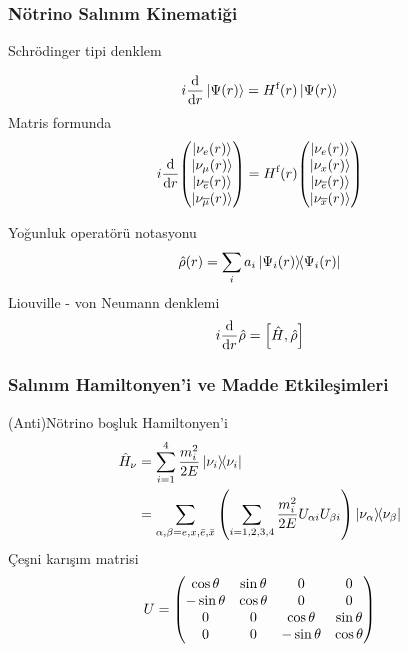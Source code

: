 \documentclass[10pt]{beamer}
\begin{document}
\begin{frame}[noframenumbering]
    \frametitle{Nötrino Salınım Kinematiği}
\begin{minipage}{0.45\textwidth}
Schrödinger tipi denklem

\begin{align*}
    i\dv{r} \ket{\Psi(r)}= H^{\text{f}}(r) \ket{\Psi(r)}
\end{align*}
Matris formunda 
\begin{equation*}
    i\dv{r} \mqty(\ket{\nu_{e}(r)} \\ \ket{\nu_{\mu}(r)}\\ \ket{\nu_{\overline{e}}(r)}\\ \ket{\nu_{\overline{\mu}}(r)}) = H^{\text{f}}(r) \mqty(\ket{\nu_{e}(r)} \\ \ket{\nu_{x}(r)}\\ \ket{\nu_{\overline{e}}(r)}\\ \ket{\nu_{\overline{x}}(r)})
\end{equation*}
\end{minipage}%
\hfill
\begin{minipage}{0.45\textwidth}
    Yoğunluk operatörü notasyonu
\begin{equation*}
    \hat{\rho} (r) = \sum_{i} a_{i} \dyad{\Psi_{i}(r)}{\Psi_{i}(r)}
\end{equation*}
Liouville - von Neumann denklemi
\begin{equation*}
    i \dv{r} \hat{\rho} = \comm{\hat{H}}{\hat{\rho}}
\end{equation*}
\end{minipage}
\end{frame}

\begin{frame}
    \frametitle{Salınım Hamiltonyen'i ve Madde Etkileşimleri}
(Anti)Nötrino boşluk Hamiltonyen'i
\begin{align*}
    \hat{H}_{\nu} & = \sum^{4}_{i=1} \frac{m_{i}^{2}}{2E} \dyad{\nu_{i}}{\nu_{i}}\\
	              & = \sum_{\alpha,\beta = e,x,\bar{e},\bar{x}} \qty(\sum_{i=1,2,3,4} \frac{m_{i}^{2}}{2E} U_{\alpha i} U_{\beta i})\dyad{\nu_{\alpha}}{\nu_{\beta}}
\end{align*}
Çeşni karışım matrisi
\begin{equation*}
    U= \mqty( \cos \theta & \sin \theta & 0 & 0 \\ -\sin \theta & \cos \theta & 0 & 0 \\ 0 & 0 & \cos \theta & \sin \theta\\ 0 & 0 & - \sin \theta & \cos \theta)
\end{equation*}
\end{frame}
\end{document}
